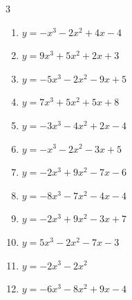 \begin{multicols}{3}
\begin{enumerate}
  \item $y=-x^{3}-2x^{2}+4x-4$


  \item $y=9x^{3}+5x^{2}+2x+3$


  \item $y=-5x^{3}-2x^{2}-9x+5$


  \item $y=7x^{3}+5x^{2}+5x+8$


  \item $y=-3x^{3}-4x^{2}+2x-4$


  \item $y=-x^{3}-2x^{2}-3x+5$


  \item $y=-2x^{3}+9x^{2}-7x-6$


  \item $y=-8x^{3}-7x^{2}-4x-4$


  \item $y=-2x^{3}+9x^{2}-3x+7$


  \item $y=5x^{3}-2x^{2}-7x-3$


\columnbreak %

  \item $y=-2x^{3}-2x^{2}$


  \item $y=-6x^{3}-8x^{2}+9x-4$



\end{enumerate}
\end{multicols}
